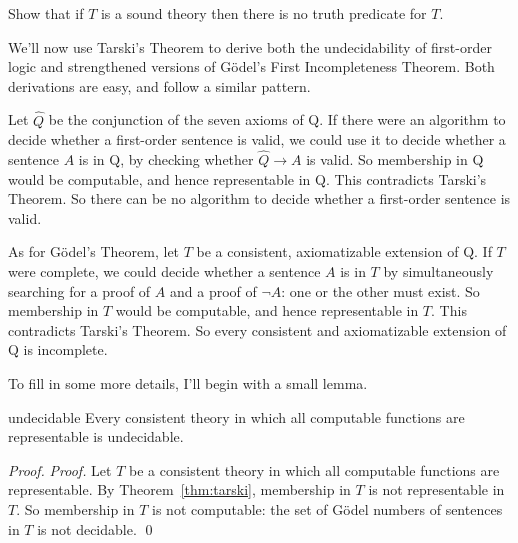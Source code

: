 \begin{exercise}
  Show that if $T$ is a sound theory then there is no truth predicate for $T$.
\end{exercise}

We'll now use Tarski's Theorem to derive both the undecidability of first-order logic
and strengthened versions of Gödel's First Incompleteness Theorem.
Both derivations are easy, and follow a similar pattern.

Let $\hat{Q}$ be the conjunction of the seven axioms of Q.
If there were an algorithm to decide whether a first-order sentence is valid,
we could use it to decide whether a sentence $A$ is in Q,
by checking whether $\hat{Q} \to A$ is valid.
So membership in Q would be computable,
and hence representable in Q.
This contradicts Tarski's Theorem.
So there can be no algorithm to decide whether a first-order sentence is valid.

As for Gödel's Theorem,
let $T$ be a consistent, axiomatizable extension of Q.
If $T$ were complete,
we could decide whether a sentence $A$ is in $T$
by simultaneously searching for a proof of $A$ and a proof of $\neg A$:
one or the other must exist.
So membership in $T$ would be computable,
and hence representable in $T$.
This contradicts Tarski's Theorem.
So every consistent and axiomatizable extension of Q is incomplete.

To fill in some more details,
I'll begin with a small lemma.

\begin{lemma}{}{undecidable}
  Every consistent theory in which all computable functions are representable is undecidable.
\end{lemma}
\begin{proof}
  \emph{Proof.}
  Let $T$ be a consistent theory in which all computable functions are representable.
  By Theorem~\ref{thm:tarski},
  membership in $T$ is not representable in $T$.
  So membership in $T$ is not computable:
  the set of Gödel numbers of sentences in $T$ is not decidable.
  \qed
\end{proof}


